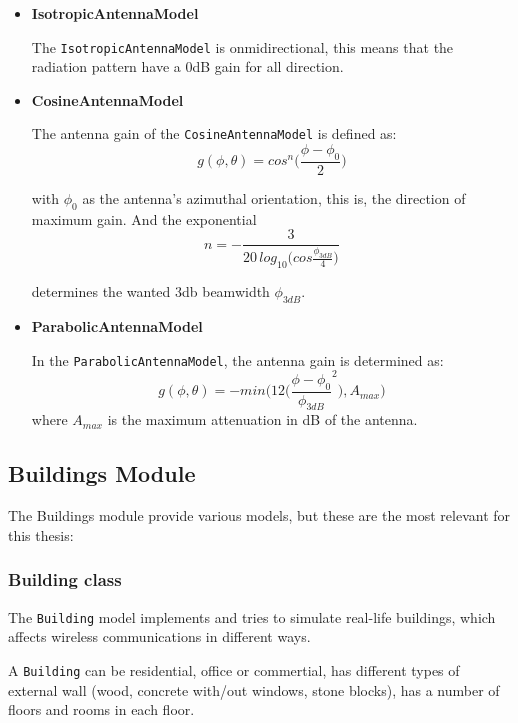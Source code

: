\begin{itemize}[itemsep=0pt, topsep=0pt]
  \item \textbf{IsotropicAntennaModel} 
  
  The \texttt{IsotropicAntennaModel} is onmidirectional, this means that the radiation pattern have
  a 0dB gain for all direction.
  \item \textbf{CosineAntennaModel}
  
  The antenna gain of the \texttt{CosineAntennaModel} is defined as:
  \begin{equation}
    g(\phi,\theta)=cos^n \bigg( \frac{\phi-\phi_0}{2} \bigg)
  \end{equation}

  with ${\phi_0}$ as the antenna's azimuthal orientation, this is, the direction of maximum gain. And the exponential
  \begin{equation}
    n=-\frac{3}{20\,log_{10} \big( cos\frac{\phi_{3dB}}{4} \big) }
  \end{equation}

  determines the wanted 3db beamwidth ${\phi_{3dB}}$.
  \item \textbf{ParabolicAntennaModel}

  In the \texttt{ParabolicAntennaModel}, the antenna gain is determined as:
  \begin{equation}
    g(\phi,\theta)=-min \bigg( 12 \bigg( \frac{\phi-\phi_0}{\phi_{3dB}}^2 \bigg) ,A_{max} \bigg)
  \end{equation}
  where ${A_{max}}$ is the maximum attenuation in dB of the antenna. 
\end{itemize}

\subsection{Buildings Module}
The Buildings module provide various models, but these are the most relevant for this thesis:

\subsubsection{Building class}

The \texttt{Building} model implements and tries to simulate real-life buildings, which affects
wireless communications in different ways.

A \texttt{Building} can be residential, office or commertial, has different types of external
wall (wood, concrete with/out windows, stone blocks), has a number of floors and rooms in each floor.

